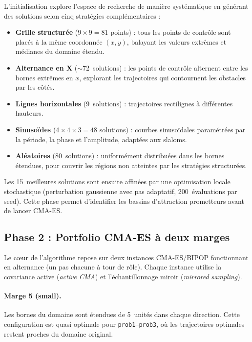 L'initialisation explore l'espace de recherche de manière systématique en
générant des solutions selon cinq stratégies complémentaires :

\begin{itemize}[nosep]
  \item \textbf{Grille structurée} ($9 \times 9 = 81$ points) : tous les
        points de contrôle sont placés à la même coordonnée $(x, y)$, balayant
        les valeurs extrêmes et médianes du domaine étendu.
  \item \textbf{Alternance en X} ($\sim$72~solutions) : les points de contrôle
        alternent entre les bornes extrêmes en $x$, explorant les trajectoires
        qui contournent les obstacles par les côtés.
  \item \textbf{Lignes horizontales} (9~solutions) : trajectoires rectilignes
        à différentes hauteurs.
  \item \textbf{Sinusoïdes} ($4 \times 4 \times 3 = 48$ solutions) : courbes
        sinusoïdales paramétrées par la période, la phase et l'amplitude,
        adaptées aux slaloms.
  \item \textbf{Aléatoires} (80~solutions) : uniformément distribuées dans les
        bornes étendues, pour couvrir les régions non atteintes par les
        stratégies structurées.
\end{itemize}

Les 15~meilleures solutions sont ensuite affinées par une optimisation locale
stochastique (perturbation gaussienne avec pas adaptatif, 200~évaluations par
seed).  Cette phase permet d'identifier les bassins d'attraction prometteurs
avant de lancer CMA-ES.

\subsection{Phase 2 : Portfolio CMA-ES à deux marges}

Le c\oe ur de l'algorithme repose sur deux instances CMA-ES/BIPOP fonctionnant
en alternance (un pas chacune à tour de rôle).  Chaque instance utilise la
covariance active (\textit{active CMA}) et l'échantillonnage miroir
(\textit{mirrored sampling}).

\paragraph{Marge 5 (small).}
Les bornes du domaine sont étendues de 5~unités dans chaque direction.  Cette
configuration est quasi optimale pour \texttt{prob1}--\texttt{prob3}, où les
trajectoires optimales restent proches du domaine original.

